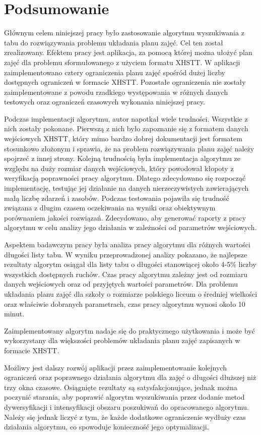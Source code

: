 \chapter{Podsumowanie}

Głównym celem niniejszej pracy było zastosowanie algorytmu wyszukiwania z tabu do rozwiązywania problemu układania planu zajęć. Cel ten został zrealizowany. Efektem pracy jest aplikacja, za pomocą której można ułożyć plan zajęć dla problemu sformułowanego z użyciem formatu  XHSTT. W aplikacji zaimplementowano cztery ograniczenia planu zajęć spośród dużej liczby dostępnych ograniczeń w formacie XHSTT. Pozostałe ograniczenia nie zostały zaimplementowane z powodu rzadkiego występowania w różnych danych testowych oraz ograniczeń czasowych wykonania niniejszej pracy. 

Podczas implementacji algorytmu, autor napotkał wiele trudności. Wszystkie z nich zostały pokonane. Pierwszą z nich było zapoznanie się z formatem danych wejściowych XHSTT, który mimo bardzo dobrej dokumentacji jest formatem stosunkowo złożonym i sprawia, że na problem rozwiązywania planu zajęć należy spojrzeć z innej strony. Kolejną trudnością była implementacja algorytmu ze względu na duży rozmiar danych wejściowych, który powodował kłopoty z weryfikacją poprawności pracy algorytmu. Dlatego zdecydowano się rozpocząć implementację, testując jej działanie na danych nierzeczywistych zawierających małą liczbę zdarzeń i zasobów. Podczas testowania pojawiła się trudność związana z długim czasem oczekiwania na wyniki oraz obiektywnym porównaniem jakości rozwiązań. Zdecydowano, aby generować raporty z pracy algorytmu w celu analizy jego działania w zależności od parametrów wejściowych.

Aspektem badawczym pracy była analiza pracy algorytmu dla różnych wartości długości listy tabu. W wyniku przeprowadzonej analizy pokazano, że najlepsze rezultaty algorytm osiągał dla listy tabu o długości stanowiącej około 4-5\% liczby wszystkich dostępnych ruchów. Czas pracy algorytmu zależny jest od rozmiaru danych wejściowych oraz od przyjętych wartości parametrów. Dla problemu układania planu zajęć dla szkoły o rozmiarze polskiego liceum o średniej wielkości oraz właściwie dobranych parametrach, czas pracy algorytmu wynosi około 10 minut.

Zaimplementowany algorytm nadaje się do praktycznego użytkowania i może być wykorzystany dla większości problemów układania planu zajęć zapisanych w formacie XHSTT.

Możliwy jest dalszy rozwój aplikacji przez zaimplementowanie kolejnych ograniczeń oraz poprawnego działania algorytmu dla zajęć o długości dłuższej niż trzy okna czasowe. Osiągnięte rezultaty są satysfakcjonujące, jednak można poczynić starania, aby poprawić algorytm wyszukiwania przez dodanie metod dywersyfikacji i intensyfikacji obszaru poszukiwań do opracowanego algorytmu. Należy się jednak liczyć z tym, że każde dodatkowe ograniczenie wydłuży czas działania algorytmu, co spowoduje konieczność jego optymalizacji.
